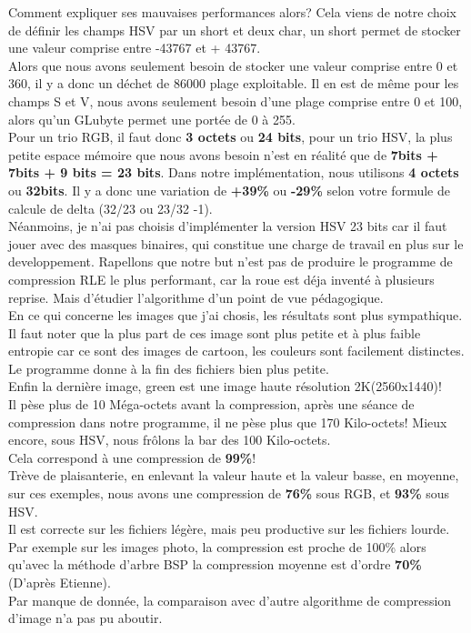 \documentclass[12pt, letterpaper]{article}
\begin{document}
Comment expliquer ses mauvaises performances alors? Cela viens de notre choix de définir 
les champs HSV par un short et deux char, un short permet de stocker une valeur comprise entre -43767 et + 43767. \\
Alors que nous avons seulement besoin de stocker une valeur comprise entre 0 et 360, il y a donc un déchet de 86000 plage 
exploitable. Il en est de même pour les champs S et V, nous avons seulement besoin d'une plage comprise entre 0 et 100, alors 
qu'un GLubyte permet une portée de 0 à 255.\\
Pour un trio RGB, il faut donc \textbf{3 octets} ou \textbf{24 bits}, pour un trio HSV, la plus petite espace mémoire que nous avons besoin 
n'est en réalité que de \textbf{7bits + 7bits + 9 bits = 23 bits}. Dans notre implémentation, nous utilisons \textbf{4 octets} ou \textbf{32bits}.
Il y a donc une variation de \textbf{+39\%} ou \textbf{-29\%} selon votre formule de calcule de delta (32/23 ou 23/32 -1).\\
Néanmoins, je n'ai pas choisis d'implémenter la version HSV 23 bits car il faut jouer avec des masques binaires, qui constitue une charge de travail
en plus sur le developpement. Rapellons que notre but n'est pas de produire le programme de compression RLE le plus performant, car la roue est déja inventé 
à plusieurs reprise. Mais d'étudier l'algorithme d'un point de vue pédagogique. 
\break
\\
\hspace{1cm}En ce qui concerne les images que j'ai chosis, les résultats sont plus sympathique.
Il faut noter que la plus part de ces image sont plus petite et à plus faible entropie car ce sont des 
images de cartoon, les couleurs sont facilement distinctes. Le programme donne à la fin des fichiers bien plus petite.
\break
\\
\hspace{1cm}Enfin la dernière image, green est une image haute résolution 2K(2560x1440)!\\
Il pèse plus de 10 Méga-octets avant la compression, après une séance de compression dans notre programme,
il ne pèse plus que 170 Kilo-octets! Mieux encore, sous HSV, nous frôlons la bar des 100 Kilo-octets.\\
Cela correspond à une compression de \textbf{99\%}! \\
Trève de plaisanterie, en enlevant la valeur haute et la valeur basse, en moyenne, sur ces exemples, 
nous avons une compression de \textbf{76\%} sous RGB, et \textbf{93\%} sous HSV.\\
Il est correcte sur les fichiers légère, mais peu productive sur les fichiers lourde. 
Par exemple sur les images photo, la compression est proche de 100\% 
alors qu'avec la méthode d'arbre BSP la compression moyenne est d'ordre \textbf{70\%} (D'après Etienne).\\
Par manque de donnée, la comparaison avec d'autre algorithme de compression d'image n'a pas pu aboutir.
\end{document}
